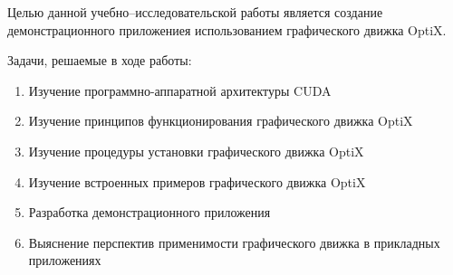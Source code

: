 Целью данной учебно--исследовательской работы является создание демонстрационного приложениея использованием графического движка OptiX.

Задачи, решаемые в ходе работы:
\begin{enumerate}
\item Изучение  программно-аппаратной архитектуры CUDA
\item Изучение принципов функционирования графического движка OptiX
\item Изучение процедуры установки графического движка OptiX
\item Изучение встроенных примеров графического движка OptiX
\item Разработка демонстрационного приложения
\item Выяснение перспектив применимости графического движка в прикладных приложениях
\end{enumerate}